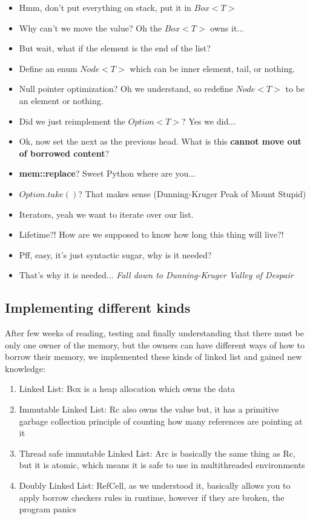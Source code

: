 \documentclass[11pt,twoside,a4paper]{article}
\begin{document}
\begin{itemize}
      \item Hmm, don't put everything on stack, put it in $Box<T>$
      \item Why can't we move the value? Oh the $Box<T>$ owns it...
      \item But wait, what if the element is the end of the list?
      \item Define an enum $Node<T>$ which can be inner element, tail, or nothing.
      \item Null pointer optimization? Oh we understand, so redefine $Node<T>$ to
            be an element or nothing.
      \item Did we just reimplement the $Option<T>$? Yes we did...
      \item Ok, now set the next as the previous head. What is this
            \textbf{cannot move out of borrowed content}?
      \item \textbf{mem::replace}? Sweet Python where are you...
      \item $Option.take()$? That makes sense (Dunning-Kruger Peak of Mount Stupid)
      \item Iterators, yeah we want to iterate over our list.
      \item Lifetime?! How are we supposed to know how long this thing will live?!
      \item Pff, easy, it's just syntactic sugar, why is it needed?
      \item That's why it is needed... \emph{Fall down to Dunning-Kruger Valley of Despair}
\end{itemize}

\subsection*{Implementing different kinds}

After few weeks of reading, testing and finally understanding that there must
be only one owner of the memory, but the owners can have different ways of
how to borrow their memory, we implemented these kinds of linked list and gained
new knowledge:

\begin{enumerate}
      \item Linked List: Box is a heap allocation which owns the data
      \item Immutable Linked List: Rc also owns the value but, it has a primitive
            garbage collection principle of counting how many references are pointing
            at it
      \item Thread safe immutable Linked List: Arc is basically the same thing as
            Rc, but it is atomic, which means it is safe to use in multithreaded environments
      \item Doubly Linked List: RefCell, as we understood it, basically allows you
            to apply borrow checkers rules in runtime, however if they are broken,
            the program panics
\end{enumerate}
\end{document}
